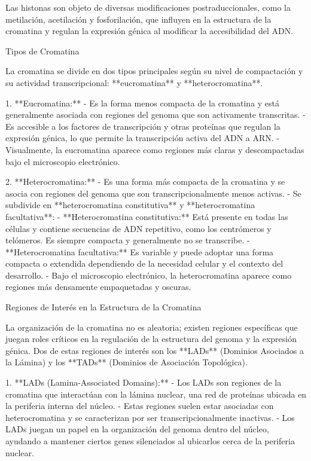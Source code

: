 Las histonas son objeto de diversas modificaciones postraduccionales, como la metilación, acetilación y fosforilación, que influyen en la estructura de la cromatina y regulan la expresión génica al modificar la accesibilidad del ADN.

Tipos de Cromatina

La cromatina se divide en dos tipos principales según su nivel de compactación y su actividad transcripcional: **eucromatina** y **heterocromatina**.

1. **Eucromatina:**
- Es la forma menos compacta de la cromatina y está generalmente asociada con regiones del genoma que son activamente transcritas.
- Es accesible a los factores de transcripción y otras proteínas que regulan la expresión génica, lo que permite la transcripción activa del ADN a ARN.
- Visualmente, la eucromatina aparece como regiones más claras y descompactadas bajo el microscopio electrónico.

2. **Heterocromatina:**
- Es una forma más compacta de la cromatina y se asocia con regiones del genoma que son transcripcionalmente menos activas.
- Se subdivide en **heterocromatina constitutiva** y **heterocromatina facultativa**:
- **Heterocromatina constitutiva:** Está presente en todas las células y contiene secuencias de ADN repetitivo, como los centrómeros y telómeros. Es siempre compacta y generalmente no se transcribe.
- **Heterocromatina facultativa:** Es variable y puede adoptar una forma compacta o extendida dependiendo de la necesidad celular y el contexto del desarrollo.
- Bajo el microscopio electrónico, la heterocromatina aparece como regiones más densamente empaquetadas y oscuras.

Regiones de Interés en la Estructura de la Cromatina

La organización de la cromatina no es aleatoria; existen regiones específicas que juegan roles críticos en la regulación de la estructura del genoma y la expresión génica. Dos de estas regiones de interés son los **LADs** (Dominios Asociados a la Lámina) y los **TADs** (Dominios de Asociación Topológica).

1. **LADs (Lamina-Associated Domains):**
- Los LADs son regiones de la cromatina que interactúan con la lámina nuclear, una red de proteínas ubicada en la periferia interna del núcleo.
- Estas regiones suelen estar asociadas con heterocromatina y se caracterizan por ser transcripcionalmente inactivas.
- Los LADs juegan un papel en la organización del genoma dentro del núcleo, ayudando a mantener ciertos genes silenciados al ubicarlos cerca de la periferia nuclear.

